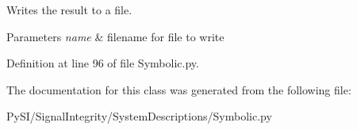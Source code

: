 Writes the result to a file. 


\begin{DoxyParams}{Parameters}
{\em name} & filename for file to write \\
\hline
\end{DoxyParams}


Definition at line 96 of file Symbolic.\+py.



The documentation for this class was generated from the following file\+:\begin{DoxyCompactItemize}
\item 
Py\+S\+I/\+Signal\+Integrity/\+System\+Descriptions/Symbolic.\+py\end{DoxyCompactItemize}
